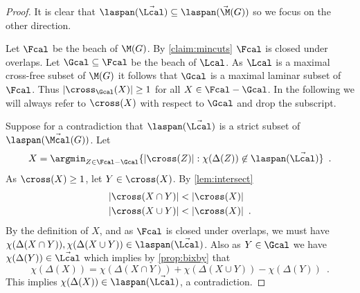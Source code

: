 \begin{proof}
It is clear that $\laspan(\vec{\Lcal}) \subseteq \laspan(\vec{\M}(G))$ so we focus on the other direction.

Let $\Fcal$ be the beach of $\M(G)$.  By \cref{claim:mincuts} $\Fcal$ is closed under overlaps.  Let $\Gcal \subseteq \Fcal$ be the beach of $\Lcal$.  As $\Lcal$ is a
maximal cross-free subset of $\M(G)$ it follows that $\Gcal$ is a maximal laminar subset of $\Fcal$.
Thus $|\cross_{\Gcal}(X)| \ge 1$ for all $X \in \Fcal - \Gcal$.  In the following we will always refer to $\cross(X)$ with respect to $\Gcal$ and drop the subscript.

Suppose for a contradiction that $\laspan(\vec{\Lcal}) $ is a strict subset of
$\laspan(\vec{\Mcal}(G))$.  Let
\[
X = \argmin_{Z \in \Fcal - \Gcal} \{ |\cross(Z) |:  \chi(\Delta(Z)) \not \in  \laspan(\vec{\Lcal}) \} \enspace .
\]
As $\cross(X) \ge 1$, let $Y \in \cross(X)$.  By \cref{lem:intersect}
\begin{align}
\label{eq:card_cap}
|\cross(X \cap Y)| &< |\cross(X)| \\
\label{eq:card_cup}
|\cross(X \cup Y)| &< |\cross(X)| \enspace .
\end{align}
By the definition of $X$, and as $\Fcal$ is closed under overlaps, we must have
$\chi(\Delta(X \cap Y)), \chi(\Delta(X \cup Y)) \in \laspan(\vec{\Lcal})$.
Also as $Y \in \Gcal$ we have $\chi(\Delta(Y)) \in \vec{\Lcal}$ which implies by \cref{prop:bixby} that
\[
\chi(\Delta(X)) =  \chi(\Delta(X \cap Y))+ \chi(\Delta(X \cup Y)) - \chi(\Delta(Y)) \enspace.
\]
This implies $\chi(\Delta(X)) \in \laspan(\vec{\Lcal})$, a contradiction.
\end{proof}















